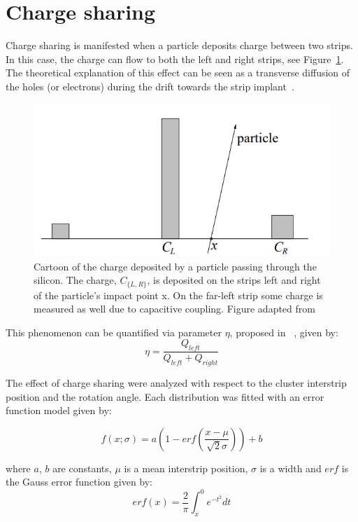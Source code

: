 \section{Charge sharing}
Charge sharing is manifested when a particle deposits charge between two strips.  In this case, the charge can flow to both the left and right strips, see Figure~\ref{fig:eta}. The theoretical explanation of this effect can be seen as a transverse diffusion of the holes (or electrons) during the drift towards the strip implant~\cite{semiconductors_det_sys}. 
 

\begin{figure}[htb]
\centering
\includegraphics[scale=0.8]{figures/eta/eta.PNG}
\caption{Cartoon of the charge deposited by a particle passing through the silicon. The charge, $C_{\{L, R\}}$, is deposited on the strips left and right of the particle’s impact point x. On the far-left strip some charge is measured as well due to capacitive coupling. Figure adapted from~\cite{eta_note} } 
\label{fig:eta}
\end{figure}

This phenomenon can be quantified via parameter $\eta$, proposed in ~\cite{eta}, given by:
\begin{equation}
    \eta = \frac{Q_{left}}{Q_{left}+Q_{right}}
\end{equation}

The effect of charge sharing were analyzed with respect to the cluster interstrip position and the rotation angle. Each distribution was fitted with an error function model given by:

\begin{equation}
\label{eq:eta_model}
f(x;\sigma) = a \left(1 - erf(\frac{x-\mu}{\sqrt{2}\sigma})\right) + b
\end{equation}

where $a$, $b$ are constants,  $\mu$ is a mean interstrip position, $\sigma$ is a width and $erf$ is the Gauss error function given by:
\begin{equation}
erf(x) = \frac{2}{\pi} \int^{0}_{x} e^{-t^2} dt
\end{equation}

